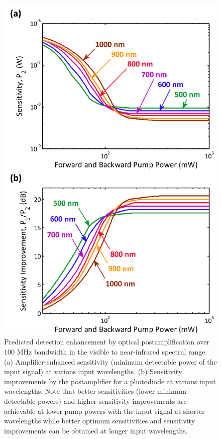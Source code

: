 \begin{figure}[htb!]
\centering
\includegraphics[scale=1]{JOSAA2013/Figure5.png}
\caption{Predicted detection enhancement by optical postamplification over 100 MHz bandwidth in the visible to near-infrared spectral range. (a) Amplifier-enhanced sensitivity (minimum detectable power of the input signal) at various input wavelengths. (b) Sensitivity improvements by the postamplifier for a photodiode at various input wavelengths. Note that better sensitivities (lower minimum detectable powers) and higher sensitivity improvements are achievable at lower pump powers with the input signal at shorter wavelengths while better optimum sensitivities and sensitivity improvements can be obtained at longer input wavelengths.}
\label{fig:JOSAA2013_Figure5}
\end{figure}

